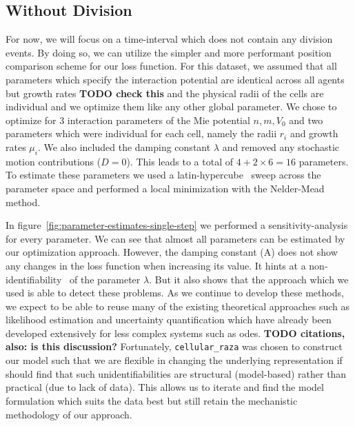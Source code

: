 \documentclass{article}
\begin{document}
\subsection{Without Division}
For now, we will focus on a time-interval which does not contain any division events.
By doing so, we can utilize the simpler and more performant position comparison scheme for our loss
function.
For this dataset, we assumed that all parameters which specify the interaction potential are
identical across all agents but growth rates \textbf{TODO check this} and the physical radii of the
cells are individual and we optimize them like any other global parameter.
We chose to optimize for 3 interaction parameters of the Mie potential $n,m,V_0$ and two parameters
which were individual for each cell, namely the radii $r_i$ and growth rates $\mu_i$.
We also included the damping constant $\lambda$ and removed any stochastic motion contributions
($D=0$).
This leads to a total of $4+2\times 6=16$ parameters.
To estimate these parameters we used a latin-hypercube~\cite{McKay1979} sweep across the parameter
space and performed a local minimization with the Nelder-Mead~\cite{Powell1973} method.

In figure~\ref{fig:parameter-estimates-single-step} we performed a sensitivity-analysis for every
parameter.
We can see that almost all parameters can be estimated by our optimization approach.
However, the damping constant (A) does not show any changes in the loss function when increasing its
value.
It hints at a non-identifiability~\cite{Raue2009} of the parameter $\lambda$.
But it also shows that the approach which we used is able to detect these problems.
As we continue to develop these methods, we expect to be able to reuse many of the existing
theoretical approaches such as likelihood estimation and uncertainty quantification which have
already been developed extensively for less complex systems such as \acp{ode}.
\textbf{TODO citations, also: is this discussion?}
Fortunately, \texttt{cellular\_raza} was chosen to construct our model such that we are flexible in
changing the underlying representation if should find that such unidentifiabilities are structural
(model-based) rather than practical (due to lack of data).
This allows us to iterate and find the model formulation which suits the data best but still retain
the mechanistic methodology of our approach.
\end{document}
